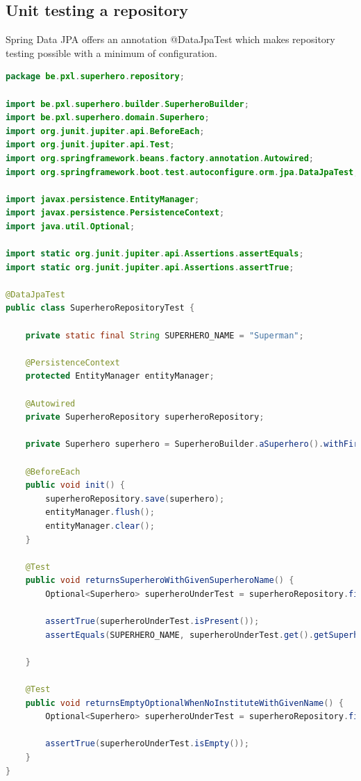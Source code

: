 \subsection{Unit testing a repository}

Spring Data JPA offers an annotation @DataJpaTest which makes repository testing possible with a minimum of configuration. 


\begin{lstlisting}[frame=single, language=java]
package be.pxl.superhero.repository;

import be.pxl.superhero.builder.SuperheroBuilder;
import be.pxl.superhero.domain.Superhero;
import org.junit.jupiter.api.BeforeEach;
import org.junit.jupiter.api.Test;
import org.springframework.beans.factory.annotation.Autowired;
import org.springframework.boot.test.autoconfigure.orm.jpa.DataJpaTest;

import javax.persistence.EntityManager;
import javax.persistence.PersistenceContext;
import java.util.Optional;

import static org.junit.jupiter.api.Assertions.assertEquals;
import static org.junit.jupiter.api.Assertions.assertTrue;

@DataJpaTest
public class SuperheroRepositoryTest {

	private static final String SUPERHERO_NAME = "Superman";

	@PersistenceContext
	protected EntityManager entityManager;

	@Autowired
	private SuperheroRepository superheroRepository;

	private Superhero superhero = SuperheroBuilder.aSuperhero().withFirstName("Clark").withLastName("Kent").withSuperheroName(SUPERHERO_NAME).build();

	@BeforeEach
	public void init() {
		superheroRepository.save(superhero);
		entityManager.flush();
		entityManager.clear();
	}

	@Test
	public void returnsSuperheroWithGivenSuperheroName() {
		Optional<Superhero> superheroUnderTest = superheroRepository.findSuperheroBySuperheroName(SUPERHERO_NAME);

		assertTrue(superheroUnderTest.isPresent());
		assertEquals(SUPERHERO_NAME, superheroUnderTest.get().getSuperheroName());

	}

	@Test
	public void returnsEmptyOptionalWhenNoInstituteWithGivenName() {
		Optional<Superhero> superheroUnderTest = superheroRepository.findSuperheroBySuperheroName("Robin Hood");

		assertTrue(superheroUnderTest.isEmpty());
	}
}

\end{lstlisting}





